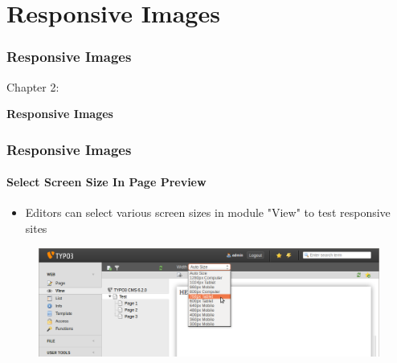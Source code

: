 %

\section{Responsive Images}
\begin{frame}[fragile]
	\frametitle{Responsive Images}

	\begin{center}\huge{Chapter 2:}\end{center}
	\begin{center}\huge{\color{typo3darkgrey}\textbf{Responsive Images}}\end{center}

\end{frame}


\begin{frame}[fragile]
	\frametitle{Responsive Images}
	\framesubtitle{Select Screen Size In Page Preview}

	\begin{itemize}
		\item Editors can select various screen sizes in module "View" to test responsive sites
	\end{itemize}

	\begin{figure}
		\includegraphics[width=0.95\linewidth]{Images/ResponsiveImages/ScreenSizeInPagePreview.png}
	\end{figure}

\end{frame}

